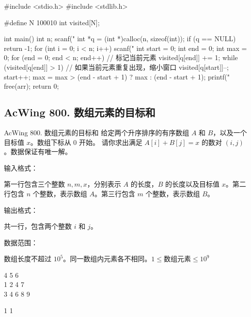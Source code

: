\begin{mycpptwocol}[最长连续不重复子序列]
    #include <stdio.h>
    #include <stdlib.h>

    #define N 100010
    int visited[N];

    int main() {
        int n;
        scanf("%
        int *q = (int *)calloc(n, sizeof(int));
        if (q == NULL) {
            return -1;
        }
        for (int i = 0; i < n; i++) {
            scanf("%
        }
        int start = 0;
        int end = 0;
        int max = 0;
        for (end = 0; end < n; end++) {
            // 标记当前元素
            visited[q[end]] += 1;
            while (visited[q[end]] > 1) {
                // 如果当前元素重复出现，缩小窗口
                visited[q[start]]--;
                start++;
            }
            max = max > (end - start + 1) ? max : (end - start + 1);
        }
        printf("%
        free(arr);
        return 0;
    }
\end{mycpptwocol}

\subsection{AcWing 800. 数组元素的目标和}
\begin{titledbox}{AcWing 800. 数组元素的目标和}
    给定两个升序排序的有序数组 $A$ 和 $B$，以及一个目标值 $x$。数组下标从 $0$ 开始。
    请你求出满足 $A[i] + B[j] = x$ 的数对 $(i, j)$。数据保证有唯一解。

    输入格式：

    第一行包含三个整数 $n,m,x$，分别表示 $A$ 的长度，$B$ 的长度以及目标值 $x$。第二行包含 $n$ 个整数，表示数组 $A$。第三行包含 $m$ 个整数，表示数组 $B$。

    输出格式：

    共一行，包含两个整数 $i$ 和 $j$。

    数据范围：

    数组长度不超过 $10^5$。同一数组内元素各不相同。$1 \le \text{数组元素} \le 10^9$

    \begin{inputblock}
        4 5 6 \\
        1 2 4 7 \\
        3 4 6 8 9
    \end{inputblock}
    \begin{outputblock}
        1 1
    \end{outputblock}
\end{titledbox}

